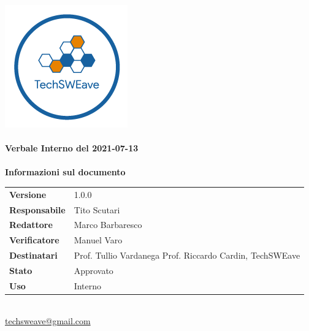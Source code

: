 \documentclass[a4paper]{article}
\begin{document}
\begin{titlepage}
    \begin{center}
        \includegraphics{../../../../Images/logo.png}\\
        \vspace{20px}
        \textcolor{logo}{\hrulefill}\\
        \vspace{20px}
        \textbf{\huge\textcolor{logo}{Verbale Interno del 2021-07-13}}\\
        \vspace{10px}
        \textcolor{logo}{\hrulefill}\\
        \vspace{40px}
        \textbf{\Large Informazioni sul documento}\\
        \vspace{20px}
        \begin{tabular}{p{100px} | p{100px}}
            \textbf{Versione}     & 1.0.0                                                                      \\
            \textbf{Responsabile} & Tito Scutari                                                               \\
            \textbf{Redattore}    & Marco Barbaresco                                                           \\
            \textbf{Verificatore} & Manuel Varo                                                                \\
            \textbf{Destinatari}  & Prof. Tullio Vardanega \newline Prof. Riccardo Cardin, \newline TechSWEave \\
            \textbf{Stato}        & Approvato                                                                  \\
            \textbf{Uso}          & Interno                                                                    \\
        \end{tabular}\\
        \vspace{60px}
        \href{mailto:techsweave@gmail.com}{techsweave@gmail.com}\\

    \end{center}
\end{titlepage}
\end{document}
